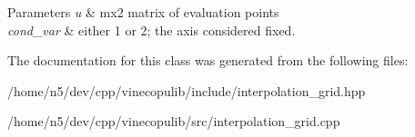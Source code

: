 \begin{DoxyParams}{Parameters}
{\em u} & mx2 matrix of evaluation points \\
\hline
{\em cond\+\_\+var} & either 1 or 2; the axis considered fixed. \\
\hline
\end{DoxyParams}


The documentation for this class was generated from the following files\+:\begin{DoxyCompactItemize}
\item 
/home/n5/dev/cpp/vinecopulib/include/interpolation\+\_\+grid.\+hpp\item 
/home/n5/dev/cpp/vinecopulib/src/interpolation\+\_\+grid.\+cpp\end{DoxyCompactItemize}
